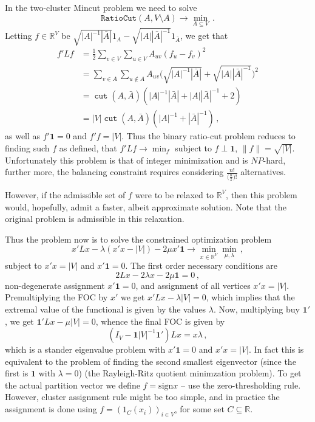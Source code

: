 \documentclass[a4paper,14pt]{extarticle}
\newcommand{\Real}{\mathbb{R}}
\newcommand{\cut}{\mathop{\mathtt{cut}}\nolimits}
\newcommand{\one}{\mathbf{1}}
\begin{document}
In the two-cluster Mincut problem we need to solve
$$ \mathtt{RatioCut}(A, V\setminus A) \to \min_{A\subseteq V} \,. $$ Letting $f \in \Real^V$
be $\sqrt{|A|^{-1}|\bar{A}|} 1_A - \sqrt{|A||\bar{A}|^{-1}} 1_{\bar{A}}$, we get that
\begin{align*}
f' L f
    &= \frac{1}{2} \sum_{v\in V} \sum_{u\in V} A_{uv} (f_u - f_v)^2\\
    &= \sum_{v\in A} \sum_{u\notin A} A_{uv} \bigl(
        \sqrt{|A|^{-1}|\bar{A}|} + \sqrt{|A||\bar{A}|^{-1}}
        \bigr)^2\\
    &= \cut(A, \bar{A}) (|A|^{-1}|\bar{A}| + |A||\bar{A}|^{-1} + 2) \\
    &= |V| \cut(A, \bar{A}) (|A|^{-1} + |\bar{A}|^{-1}) \,,
\end{align*}
as well as $f'\one = 0$ and $f'f = |V|$.
Thus the binary ratio-cut problem reduces to finding such $f$ as defined, that
$f' L f \to \min_f$ subject to $f \perp \one$, $\|f\| = \sqrt{|V|}$. Unfortunately
this problem is that of integer minimization and is $NP$-hard, further more, the
balancing constraint requires considering $\frac{n!}{\big(\frac{n}{2}\big)!}$ alternatives.

However, if the admissible set of $f$ were to be relaxed to $\Real^V$, then this
problem would, hopefully, admit a faster, albeit approximate solution. Note that
the original problem is admissible in this relaxation.

Thus the problem now is to solve the constrained optimization problem
$$ x' L x - \lambda(x' x - |V|) - 2 \mu x'\one
    \to \min_{x\in \Real^V} \min_{\mu, \lambda}
    \,, $$
subject to $x'x = |V|$ and $x'\one = 0$. The first order necessary conditions
are 
$$ 2 L x - 2 \lambda x - 2 \mu \one = 0 \,, $$
non-degenerate assignment $x'\one = 0$, and assignment of all vertices $x'x = |V|$.
Premultiplying the FOC by $x'$ we get $x' L x - \lambda |V| = 0$, which implies that
the extremal value of the functional is given by the values $\lambda$. Now, multiplying
buy $\one'$, we get $\one' L x - \mu |V| = 0$, whence the final FOC is given by
$$ (I_V - \one |V|^{-1} \one') L x = x \lambda \,, $$
which is a stander eigenvalue problem with $x'\one = 0$ and $x'x = |V|$. In fact
this is equivalent to the problem of finding the second smallest eigenvector (since
the first is $\one$ with $\lambda = 0$) (the Rayleigh-Ritz quotient minimzation
problem). To get the actual partition vector we define $f=\text{sign} x$ -- use
the zero-thresholding rule. However, cluster assignment rule might be too simple,
and in practice the assignment is done using $f = (1_C(x_i))_{i\in V}$, for some
set $C\subseteq \Real$.
\end{document}
